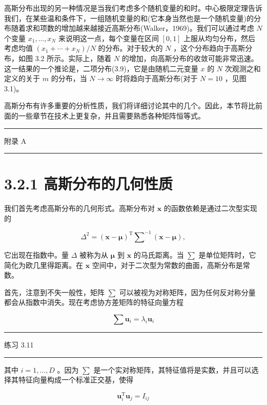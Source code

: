 \documentclass[10pt]{article}
\newcommand{\HRule}{\begin{center}\rule{0.9\linewidth}{0.2mm}\end{center}}
\begin{document}
高斯分布出现的另一种情况是当我们考虑多个随机变量的和时。中心极限定理告诉我们，在某些温和条件下，一组随机变量的和(它本身当然也是一个随机变量)的分布随着求和项数的增加越来越接近高斯分布(Walker，1969)。我们可以通过考虑 \(N\) 个变量 \({x}_{1},\ldots ,{x}_{N}\) 来说明这一点，每个变量在区间 \(\left\lbrack  {0,1}\right\rbrack\) 上服从均匀分布，然后考虑均值 \(\left( {{x}_{1} + \cdots  + {x}_{N}}\right) /N\) 的分布。对于较大的 \(N\) ，这个分布趋向于高斯分布，如图 3.2 所示。实际上，随着 \(N\) 的增加，向高斯分布的收敛可能非常迅速。这一结果的一个推论是，二项分布(3.9)，它是由随机二元变量 \(x\) 的 \(N\) 次观测之和定义的关于 \(m\) 的分布，当 \(N \rightarrow  \infty\) 时将趋向于高斯分布(对于 \(N = {10}\) ，见图 3.1)。

高斯分布有许多重要的分析性质，我们将详细讨论其中的几个。因此，本节将比前面的一些章节在技术上更复杂，并且需要熟悉各种矩阵恒等式。

\HRule

附录 A

\HRule

\section*{3.2.1 高斯分布的几何性质}

我们首先考虑高斯分布的几何形式。高斯分布对 \(\mathbf{x}\) 的函数依赖是通过二次型实现的

\[
{\Delta }^{2} = {\left( \mathbf{x} - \mathbf{\mu }\right) }^{\mathrm{T}}{\mathbf{\sum }}^{-1}\left( {\mathbf{x} - \mathbf{\mu }}\right) , \tag{3.27}
\]

它出现在指数中。量 \(\Delta\) 被称为从 \(\mathbf{\mu }\) 到 \(\mathbf{x}\) 的马氏距离。当 \(\mathbf{\sum }\) 是单位矩阵时，它简化为欧几里得距离。在 \(\mathbf{x}\) 空间中，对于二次型为常数的曲面，高斯分布是常数。

首先，注意到不失一般性，矩阵 \(\mathbf{\sum }\) 可以被视为对称矩阵，因为任何反对称分量都会从指数中消失。现在考虑协方差矩阵的特征向量方程

\[
\sum {\mathbf{u}}_{i} = {\lambda }_{i}{\mathbf{u}}_{i} \tag{3.28}
\]

\HRule

练习 3.11

\HRule

其中 \(i = 1,\ldots ,D\) 。因为 \(\mathbf{\sum }\) 是一个实对称矩阵，其特征值将是实数，并且可以选择其特征向量构成一个标准正交基，使得

\[
{\mathbf{u}}_{i}^{\mathrm{T}}{\mathbf{u}}_{j} = {I}_{ij} \tag{3.29}
\]
\end{document}
